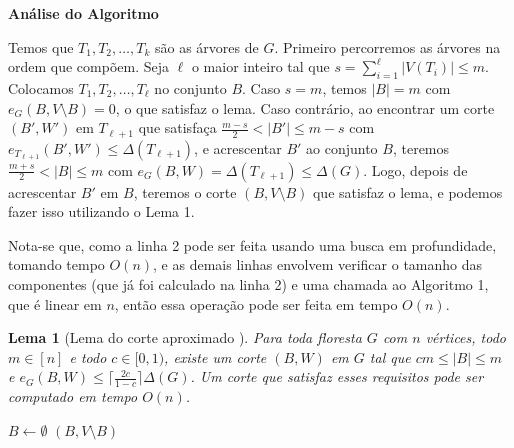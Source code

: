 \documentclass[a4paper,12pt]{article}
\newtheorem{lem}{Lema}
\begin{document}
\bigskip
\bigskip

\textbf{Análise do Algoritmo}

	Temos que $T_1, T_2, \ldots,T_k $ são 
	as árvores de $G$. 
	Primeiro percorremos as árvores na ordem que compõem. 
	Seja $\ell$ o maior inteiro tal que 
	$s = \displaystyle\sum_{i=1}^{\ell}|V(T_i)| \le m$.
	Colocamos $T_1,T_2, \ldots,T_\ell$ no conjunto $B$.
	Caso $s=m$, temos $|B|=m$ com  $e_G(B,V\setminus B)=0$, o que satisfaz o lema.
	Caso contrário, ao encontrar um corte $(B',W')$ em $T_{\ell+1}$ que
	satisfaça $\frac{m-s}{2}<|B'|\le m-s$ com $e_{T_{\ell+1}}(B',W') \le 
	\Delta(T_{\ell+1})$, e acrescentar $B'$ ao conjunto
	$B$, teremos
	$\frac{m+s}{2}<|B| \le m$ com 
	$e_G(B,W) = \Delta(T_{\ell+1}) \le \Delta(G)$.
	Logo, depois de acrescentar $B'$ em $B$, teremos o corte $(B,V\setminus B)$
	que satisfaz o lema, e podemos fazer isso utilizando o Lema 1.
	
	Nota-se que, como a linha 2 pode ser feita usando uma
	busca em profundidade, tomando tempo $O(n)$, e as demais 
	linhas envolvem verificar o tamanho das componentes 
	(que já foi calculado na linha 2) e uma chamada ao
	Algoritmo 1, que é linear em $n$, então essa operação pode 
	ser feita em tempo $O(n)$. 

\bigskip
\bigskip
\bigskip
\bigskip
\bigskip
\bigskip
\bigskip
\bigskip


\begin{lem}[Lema do corte aproximado {\cite[Lemma 3]{Schmidt15}}]

	Para toda floresta $G$ com $n$ vértices, todo $m \in [n]$
	e todo $c \in [0,1)$,
	existe um corte $(B,W)$ em $G$ tal que 
	$cm \le |B| \le m$ e
	$e_G(B,W) \le \lceil \frac{2c}{1-c}\rceil \Delta(G)$.
	Um corte que satisfaz esses requisitos pode ser computado em
	tempo $O(n)$.
\end{lem}

\medskip
\medskip

\begin{algorithm}[H]

	\caption{Computa corte aproximado em uma floresta}
	$B \gets \emptyset$\;
	{
	}
	\Return $(B,V\setminus B)$

\end{algorithm}	
\end{document}
